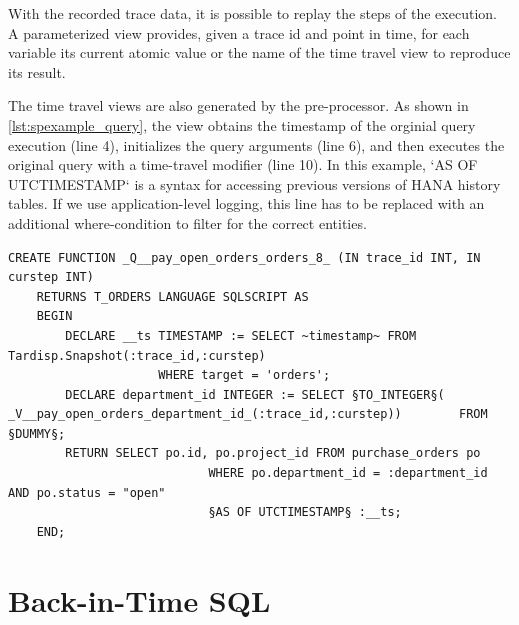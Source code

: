 With the recorded trace data, it is possible to replay the steps of the execution.
A parameterized view provides, given a trace id and point in time, for each variable its current atomic value or the name of the time travel view to reproduce its result.

The time travel views are also generated by the pre-processor.
As shown in \cref{lst:spexample_query}, the view obtains the timestamp of the orginial query execution (\cf line 4), initializes the query arguments (\cf line 6), and then executes the original query with a time-travel modifier (\cf line 10).
In this example, `AS OF UTCTIMESTAMP` is a syntax for accessing previous versions of HANA history tables.
If we use application-level logging, this line has to be replaced with an additional where-condition to filter for the correct entities.

\begin{lstlisting}[language=HanaSQL,float,caption={Example procedure with tracing code.},label=lst:spexample_query,firstnumber=1,stepnumber=5]
	CREATE FUNCTION _Q__pay_open_orders_orders_8_ (IN trace_id INT, IN curstep INT)
	RETURNS T_ORDERS LANGUAGE SQLSCRIPT AS
	BEGIN
		DECLARE __ts TIMESTAMP := SELECT ~timestamp~ FROM Tardisp.Snapshot(:trace_id,:curstep)
					 WHERE target = 'orders';
		DECLARE department_id INTEGER := SELECT §TO_INTEGER§( _V__pay_open_orders_department_id_(:trace_id,:curstep))        FROM §DUMMY§;
		RETURN SELECT po.id, po.project_id FROM purchase_orders po
							WHERE po.department_id = :department_id AND po.status = "open"
							§AS OF UTCTIMESTAMP§ :__ts;
	END;
\end{lstlisting}


%
%
%


\section{Back-in-Time SQL}



